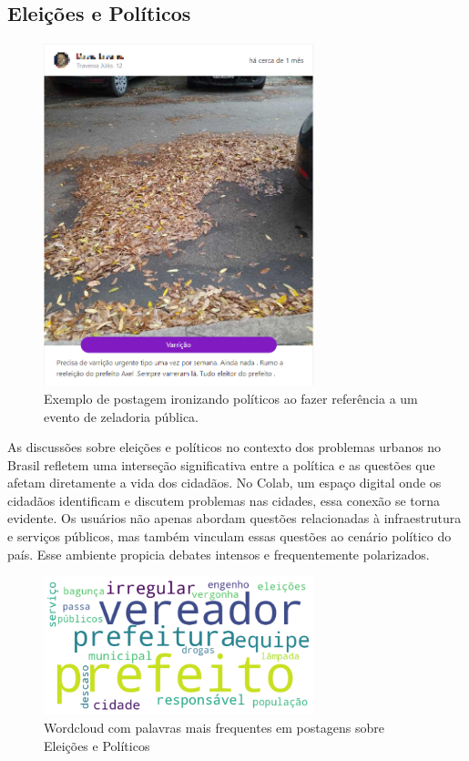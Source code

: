 \subsection{Eleições e Políticos}
\label{sec:eventos_populares_polititians}

\begin{figure}[htb]
	\centering
	\includegraphics[width=0.7\textwidth]{images/colab_posts_polititians.png}
	\caption{Exemplo de postagem ironizando políticos ao fazer referência a um evento de zeladoria pública.}
	\label{fig:colab_posts_polititians}
\end{figure}

As discussões sobre eleições e políticos no contexto dos problemas urbanos no Brasil refletem uma interseção significativa entre a política e as questões que afetam diretamente a vida dos cidadãos. No Colab, um espaço digital onde os cidadãos identificam e discutem problemas nas cidades, essa conexão se torna evidente. Os usuários não apenas abordam questões relacionadas à infraestrutura e serviços públicos, mas também vinculam essas questões ao cenário político do país. Esse ambiente propicia debates intensos e frequentemente polarizados.

\begin{figure}[htb]
	\centering
	\includegraphics[width=0.7\textwidth]{images/wordcloud_polititians.png}
	\caption{Wordcloud com palavras mais frequentes em postagens sobre Eleições e Políticos}
	\label{fig:wordcloud_polititians}
\end{figure}

